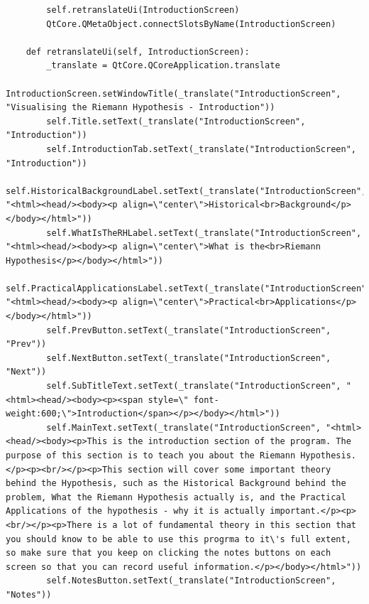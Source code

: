 \documentclass{article}
\begin{document}
\begin{lstlisting}
        self.retranslateUi(IntroductionScreen)
        QtCore.QMetaObject.connectSlotsByName(IntroductionScreen)

    def retranslateUi(self, IntroductionScreen):
        _translate = QtCore.QCoreApplication.translate
        IntroductionScreen.setWindowTitle(_translate("IntroductionScreen", "Visualising the Riemann Hypothesis - Introduction"))
        self.Title.setText(_translate("IntroductionScreen", "Introduction"))
        self.IntroductionTab.setText(_translate("IntroductionScreen", "Introduction"))
        self.HistoricalBackgroundLabel.setText(_translate("IntroductionScreen", "<html><head/><body><p align=\"center\">Historical<br>Background</p></body></html>"))
        self.WhatIsTheRHLabel.setText(_translate("IntroductionScreen", "<html><head/><body><p align=\"center\">What is the<br>Riemann Hypothesis</p></body></html>"))
        self.PracticalApplicationsLabel.setText(_translate("IntroductionScreen", "<html><head/><body><p align=\"center\">Practical<br>Applications</p></body></html>"))
        self.PrevButton.setText(_translate("IntroductionScreen", "Prev"))
        self.NextButton.setText(_translate("IntroductionScreen", "Next"))
        self.SubTitleText.setText(_translate("IntroductionScreen", "<html><head/><body><p><span style=\" font-weight:600;\">Introduction</span></p></body></html>"))
        self.MainText.setText(_translate("IntroductionScreen", "<html><head/><body><p>This is the introduction section of the program. The purpose of this section is to teach you about the Riemann Hypothesis.</p><p><br/></p><p>This section will cover some important theory behind the Hypothesis, such as the Historical Background behind the problem, What the Riemann Hypothesis actually is, and the Practical Applications of the hypothesis - why it is actually important.</p><p><br/></p><p>There is a lot of fundamental theory in this section that you should know to be able to use this progrma to it\'s full extent, so make sure that you keep on clicking the notes buttons on each screen so that you can record useful information.</p></body></html>"))
        self.NotesButton.setText(_translate("IntroductionScreen", "Notes"))
\end{lstlisting}
\end{document}
